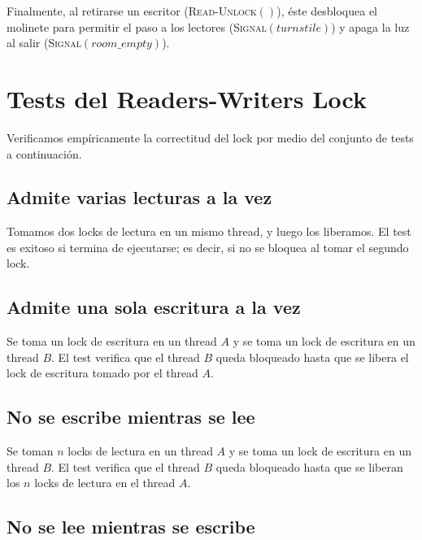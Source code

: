 \documentclass[a4paper,10pt,twoside]{article}
\newcommand{\Fn}[2]{\textsc{#1}$(#2)$}
\begin{document}
Finalmente, al retirarse un escritor (\Fn{Read-Unlock}{}), éste desbloquea el molinete para permitir el paso a los lectores (\Fn{Signal}{turnstile}) y apaga la luz al salir (\Fn{Signal}{room\_empty}). 




\section{Tests del Readers-Writers Lock}

Verificamos empíricamente la correctitud del lock por medio del conjunto de tests a continuación.


\subsection{Admite varias lecturas a la vez}

Tomamos dos locks de lectura en un mismo thread, y luego los liberamos. El test es exitoso si termina de ejecutarse; es decir, si no se bloquea al tomar el segundo lock.


\subsection{Admite una sola escritura a la vez}

Se toma un lock de escritura en un thread $A$ y se toma un lock de escritura en un thread $B$. El test verifica que el thread $B$ queda bloqueado hasta que se libera el lock de escritura tomado por el thread $A$.


\subsection{No se escribe mientras se lee}

Se toman $n$ locks de lectura en un thread $A$ y se toma un lock de escritura en un thread $B$. El test verifica que el thread $B$ queda bloqueado hasta que se liberan los $n$ locks de lectura en el thread $A$.


\subsection{No se lee mientras se escribe}
\end{document}
